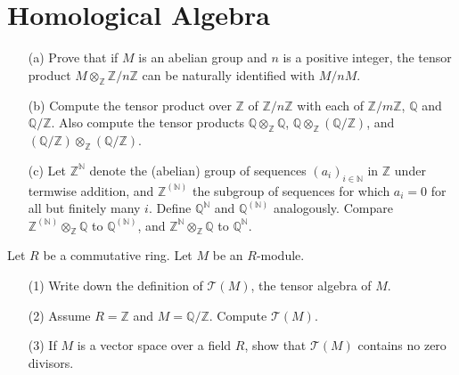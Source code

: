 \chapter{Homological Algebra}




\begin{prob}[S2012-Q2]
    \phantom{text}
    \begin{itemize}
        \item[(a)] Prove that if \(M\) is an abelian group and \(n\) is a positive integer, the tensor product \(M\otimes_{\mathbb{Z}}\mathbb{Z}/n\mathbb{Z}\) can be naturally identified with \(M/nM\).
        \item[(b)] Compute the tensor product over \(\mathbb{Z}\) of \(\mathbb{Z}/n\mathbb{Z}\) with each of \(\mathbb{Z}/m\mathbb{Z}\), \(\mathbb{Q}\) and \(\mathbb{Q}/\mathbb{Z}\). Also compute the tensor products \(\mathbb{Q}\otimes_{\mathbb{Z}}\mathbb{Q}\), \(\mathbb{Q}\otimes_{\mathbb{Z}}(\mathbb{Q}/\mathbb{Z})\), and \((\mathbb{Q}/\mathbb{Z})\otimes_{\mathbb{Z}}(\mathbb{Q}/\mathbb{Z})\).
        \item[(c)] Let \(\mathbb{Z}^\mathbb{N}\) denote the (abelian) group of sequences \((a_i)_{i\in\mathbb{N}}\) in \(\mathbb{Z}\) under termwise addition, and \(\mathbb{Z}^{(\mathbb{N})}\) the subgroup of sequences for which \(a_i = 0\) for all but finitely many \(i\). Define \(\mathbb{Q}^\mathbb{N}\) and \(\mathbb{Q}^{(\mathbb{N})}\) analogously. Compare \(\mathbb{Z}^{(\mathbb{N})}\otimes_{\mathbb{Z}}\mathbb{Q}\) to \(\mathbb{Q}^{(\mathbb{N})}\), and \(\mathbb{Z}^\mathbb{N}\otimes_{\mathbb{Z}}\mathbb{Q}\) to \(\mathbb{Q}^\mathbb{N}\).
    \end{itemize}
\end{prob}

\begin{prob}[F2006-Q4]
    Let \(R\) be a commutative ring. Let \(M\) be an \(R\)-module.
    \begin{itemize}
        \item[(1)] Write down the definition of \(\mathcal{T}(M)\), the tensor algebra of \(M\).
        \item[(2)] Assume \(R = \mathbb{Z}\) and \(M = \mathbb{Q}/\mathbb{Z}\). Compute \(\mathcal{T}(M)\).
        \item[(3)] If \(M\) is a vector space over a field \(R\), show that \(\mathcal{T}(M)\) contains no zero divisors.
    \end{itemize}
\end{prob}

